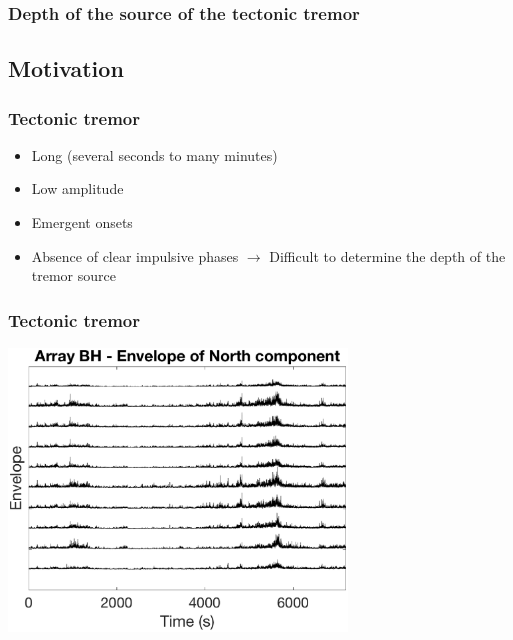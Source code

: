 \documentclass{beamer}
\begin{document}
	\begin{frame}
		\frametitle{Depth of the source of the tectonic tremor}
	\end{frame}


	\subsection{Motivation}

	\begin{frame}
		\frametitle{Tectonic tremor}
		\begin{itemize}
			\item Long (several seconds to many minutes)
			\item Low amplitude
			\item Emergent onsets
			\item Absence of clear impulsive phases $\rightarrow$ Difficult to determine the depth of the tremor source
		\end{itemize}
	\end{frame}

	\begin{frame}
		\frametitle{Tectonic tremor}
		\begin{center}
			\includegraphics[trim={0cm 0cm 0cm 0cm}, clip, width=9cm]{ETS/tremor.eps}
		\end{center}
	\end{frame}
\end{document}
